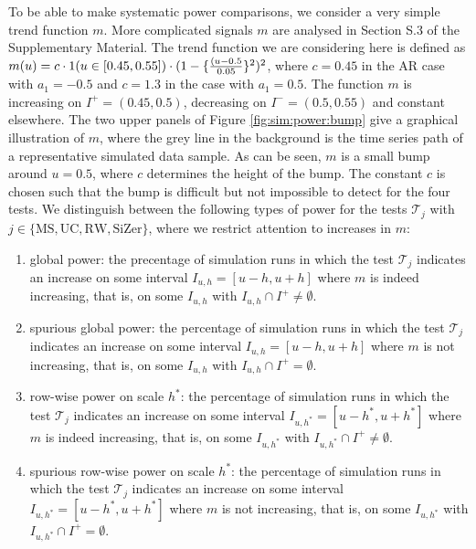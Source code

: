 To be able to make systematic power comparisons, we consider a very simple trend function $m$. More complicated signals $m$ are analysed in Section S.3 of the Supplementary Material. The trend function we are considering here is defined as $m(u) = c \cdot 1(u \in [0.45,0.55]) \cdot (1 - \{\frac{(u-0.5}{0.05}\}^2)^2$, where $c = 0.45$ in the AR case with $a_1 = -0.5$ and $c=1.3$ in the case with $a_1=0.5$. The function $m$ is increasing on $I^{+} = (0.45,0.5)$, decreasing on $I^{-} = (0.5,0.55)$ and constant elsewhere. The two upper panels of Figure \ref{fig:sim:power:bump} give a graphical illustration of $m$, where the grey line in the background is the time series path of a representative simulated data sample. As can be seen, $m$ is a small bump around $u=0.5$, where $c$ determines the height of the bump. The constant $c$ is chosen such that the bump is difficult but not impossible to detect for the four tests. We distinguish between the following types of power for the tests $\mathcal{T}_j$ with $j \in \{ \text{MS}, \text{UC}, \text{RW}, \text{SiZer} \}$, where we restrict attention to increases in $m$:
\begin{enumerate}[label=(\roman*),leftmargin=0.85cm]
\item global power: the precentage of simulation runs in which the test $\mathcal{T}_j$ indicates an increase on some interval $I_{u,h}=[u-h,u+h]$ where $m$ is indeed increasing, that is, on some $I_{u,h}$ with $I_{u,h} \cap I^+ \neq \emptyset$.
\item spurious global power: the percentage of simulation runs in which the test $\mathcal{T}_j$ indicates an increase on some interval $I_{u,h}=[u-h,u+h]$ where $m$ is not increasing, that is, on some $I_{u,h}$ with $I_{u,h} \cap I^+ = \emptyset$.
\item row-wise power on scale $h^*$: the percentage of simulation runs in which the test $\mathcal{T}_j$ indicates an increase on some interval $I_{u,h^*}=[u-h^*,u+h^*]$ where $m$ is indeed increasing, that is, on some $I_{u,h^*}$ with $I_{u,h^*} \cap I^+ \neq \emptyset$.
\item spurious row-wise power on scale $h^*$: the percentage of simulation runs in which the test $\mathcal{T}_j$ indicates an increase on some interval $I_{u,h^*}=[u-h^*,u+h^*]$ where $m$ is not increasing, that is, on some $I_{u,h^*}$ with $I_{u,h^*} \cap I^+ = \emptyset$.
\end{enumerate}



